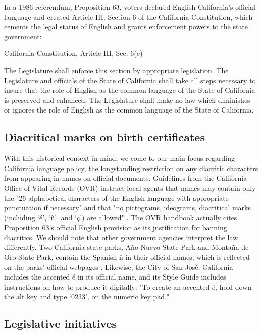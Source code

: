 In a 1986 referendum, Proposition 63, voters declared English California's
official language and created Article III, Section 6 of the California
Constitution, which cements the legal status of English and grants enforcement
powers to the state government: 

\begin{aquote}{California Constitution, Article III, Sec. 6(c)
	\parencite{ca-const}}

	The Legislature shall enforce this section by appropriate legislation. The
	Legislature and officials of the State of California shall take all steps
	necessary to insure that the role of English as the common language of the
	State of California is preserved and enhanced. The Legislature shall make no
	law which diminishes or ignores the role of English as the common language of
	the State of California.

\end{aquote}

\subsection{Diacritical marks on birth certificates}

With this historical context in mind, we come to our main focus regarding
California language policy, the longstanding restriction on any diacritic
characters from appearing in names on official documents. Guidelines from the
California Office of Vital Records (OVR) instruct local agents that names may
contain only the "26 alphabetical characters of the English language with
appropriate punctuation if necessary" and that "no pictograms, ideograms,
diacritical marks (including `é', `ñ', and `ç') are allowed"
\parencite{larson11}. The OVR handbook actually cites Proposition 63's official
English provision as its justification for banning diacritics. We should note
that other government agencies interpret the law differently. Two California
state parks, Año Nuevo State Park and Montaña de Oro State Park, contain the
Spanish ñ in their official names, which is reflected on the parks' official
webpages \parencite{año-nuevo} \parencite{montaña-de-oro} \parencite{larson11}.
Likewise, the City of San José, California includes the accented é in its
official name, and its Style Guide includes instructions on how to produce it
digitally: "To create an accented é, hold down the alt key and type `0233'‚ on
the numeric key pad." \parencite{san-josé}

\subsection{Legislative initiatives}


